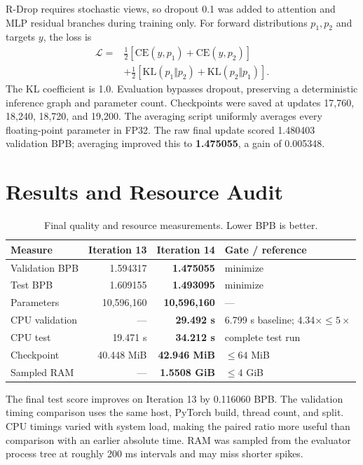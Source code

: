\documentclass[10pt,a4paper]{article}
\begin{document}
R-Drop requires stochastic views, so dropout 0.1 was added to attention and MLP residual branches during training only. For forward distributions $p_1,p_2$ and targets $y$, the loss is
\begin{align}
\mathcal L={}&\tfrac12[\mathrm{CE}(y,p_1)+\mathrm{CE}(y,p_2)]\\
&+\tfrac12[\mathrm{KL}(p_1\Vert p_2)+\mathrm{KL}(p_2\Vert p_1)].
\end{align}
The KL coefficient is 1.0. Evaluation bypasses dropout, preserving a deterministic inference graph and parameter count. Checkpoints were saved at updates 17,760, 18,240, 18,720, and 19,200. The averaging script uniformly averages every floating-point parameter in FP32. The raw final update scored 1.480403 validation BPB; averaging improved this to \textbf{1.475055}, a gain of 0.005348.

\section{Results and Resource Audit}
\begin{table}[ht]
\centering\small
\caption{Final quality and resource measurements. Lower BPB is better.}
\begin{tabular}{lrrl}
\toprule
Measure & Iteration 13 & Iteration 14 & Gate / reference\\
\midrule
Validation BPB & 1.594317 & \textbf{1.475055} & minimize\\
Test BPB & 1.609155 & \textbf{1.493095} & minimize\\
Parameters & 10,596,160 & \textbf{10,596,160} & ---\\
CPU validation & --- & \textbf{29.492 s} & 6.799 s baseline; 4.34$\times\leq5\times$\\
CPU test & 19.471 s & \textbf{34.212 s} & complete test run\\
Checkpoint & 40.448 MiB & \textbf{42.946 MiB} & $\leq64$ MiB\\
Sampled RAM & --- & \textbf{1.5508 GiB} & $\leq4$ GiB\\
\bottomrule
\end{tabular}
\end{table}

The final test score improves on Iteration 13 by 0.116060 BPB. The validation timing comparison uses the same host, PyTorch build, thread count, and split. CPU timings varied with system load, making the paired ratio more useful than comparison with an earlier absolute time. RAM was sampled from the evaluator process tree at roughly 200 ms intervals and may miss shorter spikes.
\end{document}
